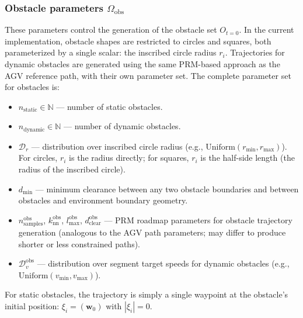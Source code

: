 \documentclass[conference]{IEEEtran}
\begin{document}
\subsubsection{Obstacle parameters $\Omega_{\text{obs}}$}
These parameters control the generation of the obstacle set $O_{t=0}$. In the current implementation, obstacle shapes are restricted to circles and squares, both parameterized by a single scalar: the inscribed circle radius $r_i$.
Trajectories for dynamic obstacles are generated using the same PRM-based approach as the AGV reference path, with their own parameter set. The complete parameter set for obstacles is:
\begin{itemize}
    \item $n_{\text{static}}\in \mathbb{N}$ --- number of static obstacles.
    \item $n_{\text{dynamic}}\in \mathbb{N}$ --- number of dynamic obstacles.
    \item $\mathcal{D}_{r}$ --- distribution over inscribed circle radius (e.g., $\mathrm{Uniform}(r_{\min}, r_{\max})$). For circles, $r_i$ is the radius directly; for squares, $r_i$ is the half-side length (the radius of the inscribed circle).
    \item $d_{\min}$ --- minimum clearance between any two obstacle boundaries and between obstacles and environment boundary geometry.
    \item $n_{\text{samples}}^{\text{obs}}$, $k_{\text{nn}}^{\text{obs}}$, $l_{\max}^{\text{obs}}$, $d_{\text{clear}}^{\text{obs}}$ --- PRM roadmap parameters for obstacle trajectory generation (analogous to the AGV path parameters; may differ to produce shorter or less constrained paths).
    \item $\mathcal{D}_{v}^{\text{obs}}$ --- distribution over segment target speeds for dynamic obstacles (e.g., $\mathrm{Uniform}(v_{\min}, v_{\max})$).
\end{itemize} 
 
For static obstacles, the trajectory is simply a single waypoint at the obstacle's initial position: $\xi_i = (\mathbf{w}_0)$ with $|\xi_i| = 0$.
 
\end{document}

